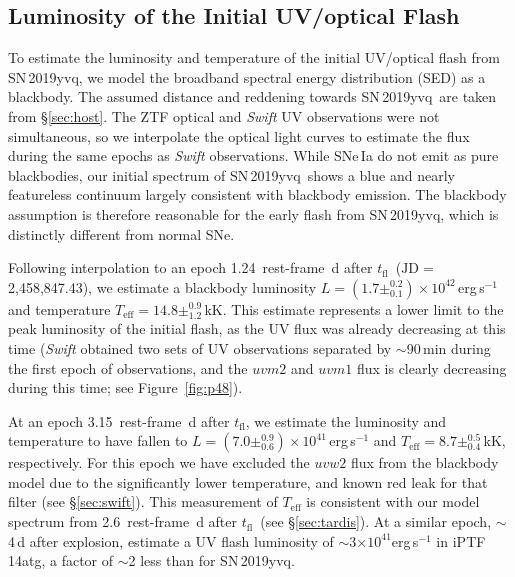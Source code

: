\documentclass[twocolumn]{aastex63}
\newcommand{\fromkate}[1]{{\color{brown} fromKM: {#1}}}
\newcommand{\tfl}{$t_\mathrm{fl}$}
\newcommand{\sn}{SN\,2019yvq}
\begin{document}

\subsection{Luminosity of the Initial UV/optical Flash}\label{sec:luminosity}

To estimate the luminosity and temperature of the initial UV/optical flash
from \sn, we model the broadband spectral energy distribution (SED) as a
blackbody. The assumed distance and reddening towards \sn\ are taken from
\S\ref{sec:host}. The ZTF optical and \textit{Swift} UV observations were not
simultaneous, so we interpolate the optical light curves to estimate the flux
during the same epochs as \textit{Swift} observations. While SNe\,Ia do not
emit as pure blackbodies, our initial spectrum of \sn\ shows a blue and nearly
featureless continuum largely consistent with blackbody emission. The
blackbody assumption is therefore reasonable for the early flash from \sn,
which is distinctly different from normal SNe.

Following interpolation to an epoch 1.24~rest-frame~d after \tfl\
($\mathrm{JD} = $2,458,847.43), we estimate a blackbody luminosity $L = (1.7
\pm ^{0.2}_{0.1}) \times 10^{42}$\,erg\,s$^{-1}$ and temperature
$T_\mathrm{eff} = 14.8 \pm^{0.9}_{1.2}$\,kK. This estimate represents a lower
limit to the peak luminosity of the initial flash, as the UV flux was already
decreasing at this time (\textit{Swift} obtained two sets of UV observations
separated by $\sim$90\,min during the first epoch of observations, and the
$uvm2$ and $uvm1$ flux is clearly decreasing during this time; see
Figure~\ref{fig:p48}). 

At an epoch 3.15~rest-frame~d after \tfl, we estimate the luminosity and
temperature to have fallen to $L = (7.0 \pm ^{0.9}_{0.6}) \times
10^{41}$\,erg\,s$^{-1}$ and $T_\mathrm{eff} = 8.7 \pm^{0.5}_{0.4}$\,kK,
respectively. For this epoch we have excluded the $uvw2$ flux from the
blackbody model due to the significantly lower temperature, and known red leak
for that filter (see \S\ref{sec:swift}). This measurement of $T_\mathrm{eff}$
is consistent with our model spectrum from 2.6~rest-frame~d after \tfl\ (see
\S\ref{sec:tardis}). At a similar epoch, $\sim$4\,d after explosion,
\citet{Cao15} estimate a UV flash luminosity of $\sim$3$ \times
10^{41}$erg\,s$^{-1}$ in iPTF\,14atg, a factor of $\sim$2 less than for \sn.
\end{document}
